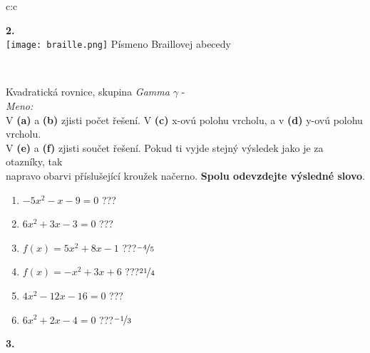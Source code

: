 \documentclass[10pt]{report}
\begin{document}
\begin{tabular}{c:c}
\begin{minipage}[c][99mm][t]{0.49\linewidth}
\begin{center}
\begin{minipage}{0.20\linewidth}
\begin{center}
{\Huge\bfseries 2.} \\[2mm]
\texttt{[image: braille.png]}
{\small Písmeno Braillovej abecedy}
\end{center}
\end{minipage}
\end{center}
\end{minipage}
\\ \hdashline
\begin{minipage}[c][99mm][t]{0.49\linewidth}
\begin{center}
\vspace{7mm}
{\huge Kvadratická rovnice, skupina \textit{Gamma $\gamma$} -}\\[4.5mm]
\textit{Meno:}\phantom{xxxxxxxxxxxxxxxxxxxxxxxxxxxxxxxxxxxxxxxxxxxxxxxxxxxxxxxxxxxxxxxxx}\\[3.5mm]
V \textbf{(a)} a \textbf{(b)} zjisti počet řešení. V \textbf{(c)} x-ovú polohu vrcholu, a v \textbf{(d)} y-ovú polohu vrcholu.\\V \textbf{(e)} a \textbf{(f)} zjisti součet řešení. Pokud ti vyjde stejný výsledek jako je za otazníky, tak\\napravo obarvi příslušející kroužek načerno. \textbf{Spolu odevzdejte výsledné slovo}.\\[3mm]
\begin{minipage}{0.77\linewidth}
\begin{center}
\begin{varwidth}{\textwidth}
\begin{enumerate}
\large
\item $-5x^2-x-9=0$\quad \dotfill\; ???\;\dotfill {}
\item $6x^2+3x-3=0$\quad \dotfill\; ???\;\dotfill {}
\item $f(x)=5x^2+8x-1$\quad \dotfill\; ???\;\dotfill \quad $\nicefrac{-4}{5}$
\item $f(x)=-x^2+3x+6$\quad \dotfill\; ???\;\dotfill \quad $\nicefrac{21}{4}$
\item $4x^2-12x-16=0$\quad \dotfill\; ???\;\dotfill {}
\item $6x^2+2x-4=0$\quad \dotfill\; ???\;\dotfill \quad $\nicefrac{-1}{3}$
\end{enumerate}
\end{varwidth}
\end{center}
\end{minipage}
\begin{minipage}{0.20\linewidth}
\begin{center}
{\Huge\bfseries 3.} \\[2mm]

\end{center}
\end{minipage}
\end{center}
\end{minipage}
\end{tabular}
\end{document}
